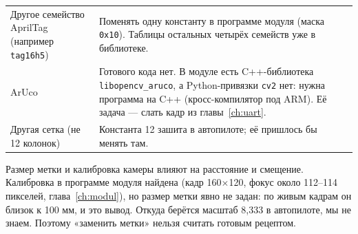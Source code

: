 \begin{tabularx}{\textwidth}{@{}p{4.6cm} Y@{}}
\toprule
{} &  \\ \midrule
Другое семейство AprilTag (например \texttt{tag16h5}) & Поменять одну константу в программе модуля (маска \texttt{0x10}). Таблицы остальных четырёх семейств уже в библиотеке. \vyv{} \\
ArUco & Готового кода нет. В модуле есть C++-библиотека \texttt{libopencv\_aruco}, а Python-привязки \texttt{cv2} нет: нужна программа на C++ (кросс-компилятор под ARM). Её задача --- слать кадр из главы~\ref{ch:uart}. \vyv{} \\
Другая сетка (не 12 колонок) & Константа 12 зашита в автопилоте; её пришлось бы менять там. \vyv{} \\ \bottomrule
\end{tabularx}

\vspace{4pt}
\begin{vnimanie}
Размер метки и калибровка камеры влияют на расстояние и смещение. Калибровка в программе модуля найдена (кадр 160$\times$120, фокус около 112--114 пикселей, глава~\ref{ch:modul}), но размер метки явно не задан: по живым кадрам он близок к 100 мм, и это вывод. Откуда берётся масштаб 8,333 в автопилоте, мы не знаем. Поэтому «заменить метки» нельзя считать готовым рецептом. \nei{}
\end{vnimanie}
